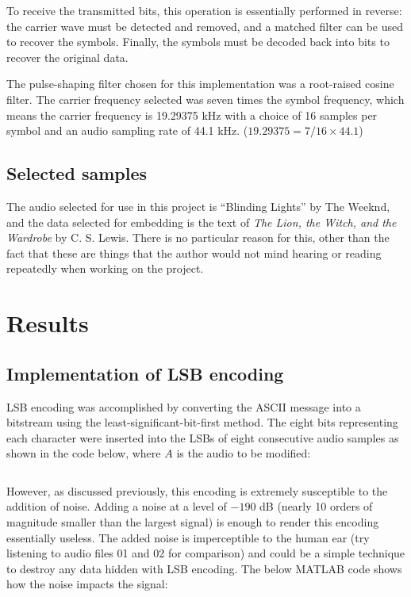 \documentclass{article}
\begin{document}
To receive the transmitted bits, this operation is essentially performed in
reverse: the carrier wave must be detected and removed, and a matched filter can
be used to recover the symbols. Finally, the symbols must be decoded back into
bits to recover the original data.

\vspace{6pt}

The pulse-shaping filter chosen for this implementation was a root-raised cosine
filter. The carrier frequency selected was seven times the symbol frequency,
which means the carrier frequency is 19.29375 kHz with a choice of 16 samples per
symbol and an audio sampling rate of 44.1 kHz. ($19.29375 = 7/16 \times 44.1$)

\subsection{Selected samples}

The audio selected for use in this project is ``Blinding Lights'' by The Weeknd,
and the data selected for embedding is the text of 
\textit{The Lion, the Witch, and the Wardrobe} by C. S. Lewis. There is no
particular reason for this, other than the fact that these are things that the
author would not mind hearing or reading repeatedly when working on the project.

\section{Results}

\subsection{Implementation of LSB encoding}

LSB encoding was accomplished by converting the ASCII message into a bitstream
using the least-significant-bit-first method. The eight bits representing each
character were inserted into the LSBs of eight consecutive audio samples as
shown in the code below, where $A$ is the audio to be modified:

\inputminted[xleftmargin=24pt, linenos=true, breaklines, firstline=26, lastline=33]{matlab}{src/encode_message_LSB.m}

However, as discussed previously, this encoding is extremely susceptible to
the addition of noise. Adding a noise at a level of $-190$ dB (nearly 10 orders
of magnitude smaller than the largest signal) is enough to render this encoding
essentially useless. The added noise is imperceptible to the human ear (try
listening to audio files 01 and 02 for comparison) and could be a simple
technique to destroy any data hidden with LSB encoding. The below MATLAB code
shows how the noise impacts the signal:
\end{document}
